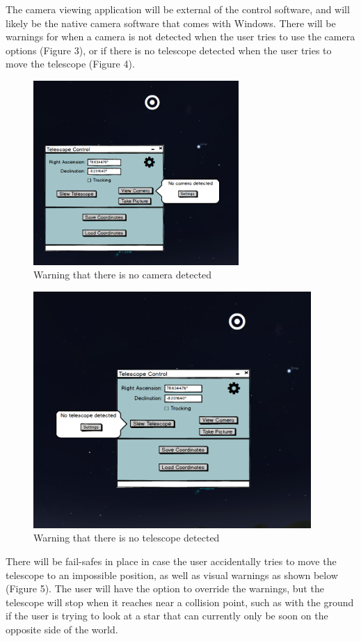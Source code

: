 \documentclass[12pt]{report}
\begin{document}
The camera viewing application will be external of the control software, and will likely be the native camera software that comes with Windows. There will be warnings for when a camera is not detected when the user tries to use the camera options (Figure 3), or if there is no telescope detected when the user tries to move the telescope (Figure 4).

\begin{figure}[h]
	\centering
	\includegraphics[width=0.70\linewidth, height=7cm]{NoCameraDetected}
	\caption{Warning that there is no camera detected}
\end{figure}

\newpage


\begin{figure}[h]
	\centering
	\includegraphics[width=0.70\linewidth, height=9cm]{MainScreenNoTelescope}
	\caption{Warning that there is no telescope detected}
\end{figure}

There will be fail-safes in place in case the user accidentally tries to move the telescope to an impossible position, as well as visual warnings as shown below (Figure 5). The user will have the option to override the warnings, but the telescope will stop when it reaches near a collision point, such as with the ground if the user is trying to look at a star that can currently only be soon on the opposite side of the world.
\end{document}
